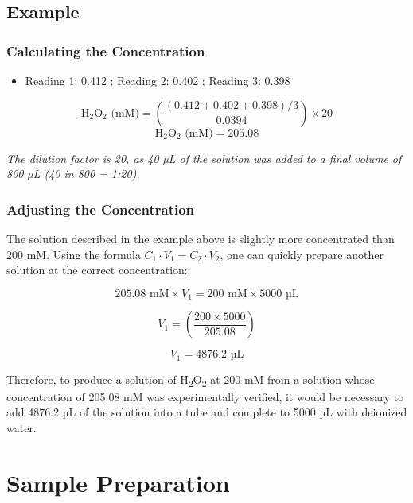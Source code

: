 \documentclass[
  9pt,
  american,
  a5paper,
  extrafontsizes,onecolumn,openright
  ]{memoir}
\providecommand{\tightlist}{%
  \setlength{\itemsep}{0pt}\setlength{\parskip}{0pt}}
\begin{document}
\subsection{Example}\label{example}

\subsubsection{Calculating the Concentration}\label{calculating-the-concentration}

\scriptsize

\normalsize

\begin{itemize}
\tightlist
\item
  Reading 1: 0.412 ; Reading 2: 0.402 ; Reading 3: 0.398
\end{itemize}

\[\text{H}_2 \text{O}_2 \text{ (mM)} = \left( \frac{\left( 0.412 + 0.402 + 0.398 \right) / 3}{0.0394} \right) \times 20\]
\[\text{H}_2 \text{O}_2 \text{ (mM)} = 205.08\]

\begin{greybox}[frametitle = Note]
\emph{The dilution factor is 20, as 40 µL of the solution was added to a final volume of 800 µL (40 in 800 = 1:20).}

\end{greybox}

\subsubsection{Adjusting the Concentration}\label{adjusting-the-concentration}

The solution described in the example above is slightly more concentrated than 200 mM. Using the formula \(C_1 \cdot V_1 = C_2 \cdot V_2\), one can quickly prepare another solution at the correct concentration:

\[205.08 \text{ mM}\times V_1 = 200 \text{ mM} \times 5000 \text{ µL}\]

\[V_1 = \left( \frac{200 \times 5000}{205.08} \right)\]

\[V_1 = 4876.2 \text{ µL}\]

Therefore, to produce a solution of H\textsubscript{2}O\textsubscript{2} at 200 mM from a solution whose concentration of 205.08 mM was experimentally verified, it would be necessary to add 4876.2 µL of the solution into a tube and complete to 5000 µL with deionized water.

\section{Sample Preparation}\label{sample_prep}
\end{document}
